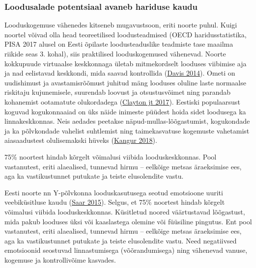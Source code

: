 \documentclass[estonian,]{article}
\begin{document}
\hypertarget{loodusalade-potentsiaal-avaneb-hariduse-kaudu}{%
\subsubsection*{Loodusalade potentsiaal avaneb hariduse kaudu}\label{loodusalade-potentsiaal-avaneb-hariduse-kaudu}}

Looduskogemuse vähenedes kitseneb mugavustsoon, eriti noorte puhul. Kuigi noortel võivad olla head teoreetilised loodusteadmised (OECD haridusstatistika, PISA 2017 alusel on Eesti õpilaste loodusteaduslike teadmiste tase maailma riikide seas 3. kohal), siis praktilised looduskogemused vähenevad. Noorte kokkupuude virtuaalse keskkonnaga ületab mitmekordselt looduses viibimise aja ja nad eelistavad keskkondi, mida saavad kontrollida (\protect\hyperlink{Davis2014}{Davis 2014}). Ometi on uudishimust ja avastamisrõõmust juhitud mäng looduses oluline laste normaalse riskitaju kujunemisele, suurendab loovust ja otsustusvõimet ning parandab kohanemist ootamatute olukordadega (\protect\hyperlink{Clayton2017}{Clayton jt 2017}). Eestiski populaarsust koguvad kogukonnaaiad on üks näide inimeste püüdest hoida sidet loodusega ka linnakeskkonnas. Neis aedades peetakse näpud-mullas-lõõgastumist, kogukondade ja ka põlvkondade vahelist suhtlemist ning taimekasvatuse kogemuste vahetamist aiasaadustest olulisemakski hüveks (\protect\hyperlink{Kangur2018}{Kangur 2018}).

\begin{blockquote-left}
75\% noortest hindab kõrgelt võimalusi viibida looduskeskkonnas. Pool
vastanutest, eriti alaealised, tunnevad hirmu -- eelkõige metsas
äraeksimise ees, aga ka vastikustunnet putukate ja teiste elusolendite
vastu.
\end{blockquote-left}

Eesti noorte nn Y-põlvkonna looduskasutusega seotud emotsioone uuriti veebiküsitluse kaudu (\protect\hyperlink{Saar2015}{Saar 2015}). Selgus, et 75\% noortest hindab kõrgelt võimalusi viibida looduskeskkonnas. Küsitletud noored väärtustavad lõõgastust, mida pakub looduses üksi või kaaslastega olemine või füüsiline pingutus. Ent pool vastanutest, eriti alaealised, tunnevad hirmu -- eelkõige metsas äraeksimise ees, aga ka vastikustunnet putukate ja teiste elusolendite vastu. Need negatiivsed emotsioonid seostuvad linnastumisega (võõrandumisega) ning vähenevad vanuse, kogemuse ja kontrollivõime kasvades.
\end{document}
